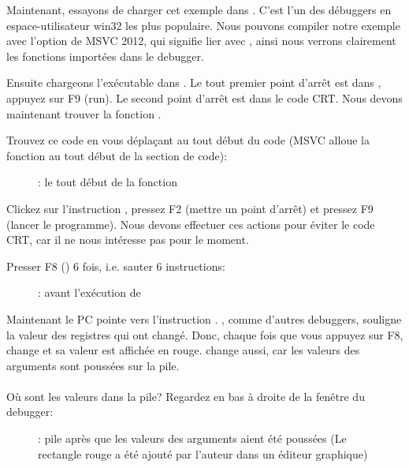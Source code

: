 \clearpage
{}
\myindex{\olly}

Maintenant, essayons de charger cet exemple dans \olly.
C'est l'un des débuggers en espace-utilisateur win32 les plus populaire.
Nous pouvons compiler notre exemple avec l'option  de MSVC 2012, qui signifie
lier avec , ainsi nous verrons clairement les fonctions importées
dans le debugger.

Ensuite chargeons l'exécutable dans \olly.
Le tout premier point d'arrêt est dans , appuyez
sur F9 (run).
Le second point d'arrêt est dans le code \ac{CRT}.
Nous devons maintenant trouver la fonction \main.

Trouvez ce code en vous déplaçant au tout début du code (MSVC alloue la fonction
\main au tout début de la section de code):
\begin{figure}[H]
\centering
{}
\caption{\olly: le tout début de la fonction \main}
\label{fig:printf3_olly_1}
\end{figure}

Clickez sur l'instruction , pressez F2 (mettre un point d'arrêt)
et pressez F9 (lancer le programme).
Nous devons effectuer ces actions pour éviter le code \ac{CRT}, car il ne nous intéresse
pas pour le moment.

\clearpage
Presser F8 (\stepover) 6 fois, i.e. sauter 6 instructions:

\begin{figure}[H]
\centering
{}
\caption{\olly: avant l'exécution de \printf}
\label{fig:printf3_olly_2}
\end{figure}

Maintenant le \ac{PC} pointe vers l'instruction .
\olly, comme d'autres debuggers, souligne la valeur des registres qui ont changé.
Donc, chaque fois que vous appuyez sur F8, \EIP change et sa valeur est affichée en rouge.
\ESP change aussi, car les valeurs des arguments sont poussées sur la pile.\\
\\
Où sont les valeurs dans la pile?
Regardez en bas à droite de la fenêtre du debugger:

\begin{figure}[H]
\centering

\caption{\olly: pile après que les valeurs des arguments aient été poussées (Le
rectangle rouge a été ajouté par l'auteur dans un éditeur graphique)}
\end{figure}

